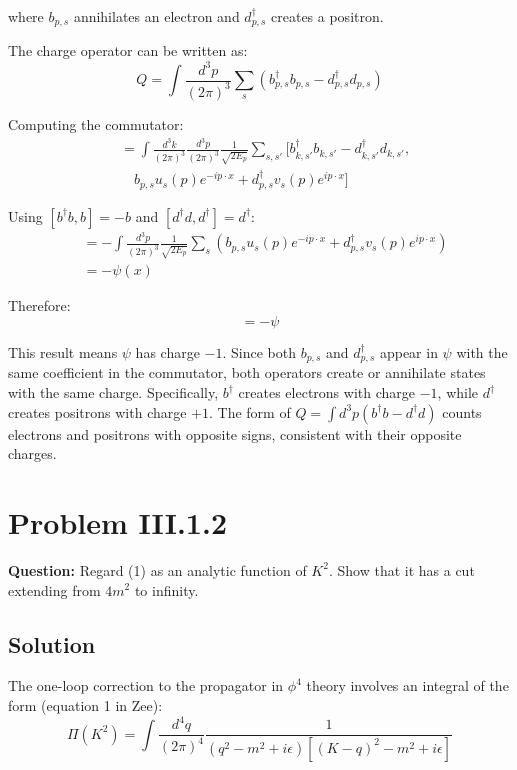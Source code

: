\documentclass[12pt]{article}
\begin{document}
where $b_{p,s}$ annihilates an electron and $d_{p,s}^\dagger$ creates a positron.

The charge operator can be written as:
\begin{equation}
Q = \int \frac{d^3p}{(2\pi)^3} \sum_s (b_{p,s}^\dagger b_{p,s} - d_{p,s}^\dagger d_{p,s})
\end{equation}

Computing the commutator:
\begin{align}
[Q, \psi(x)] &= \int \frac{d^3k}{(2\pi)^3} \frac{d^3p}{(2\pi)^3} \frac{1}{\sqrt{2E_p}} \sum_{s,s'} [b_{k,s'}^\dagger b_{k,s'} - d_{k,s'}^\dagger d_{k,s'}, \nonumber \\
&\quad b_{p,s} u_s(p) e^{-ip\cdot x} + d_{p,s}^\dagger v_s(p) e^{ip\cdot x}]
\end{align}

Using $[b^\dagger b, b] = -b$ and $[d^\dagger d, d^\dagger] = d^\dagger$:
\begin{align}
[Q, \psi(x)] &= -\int \frac{d^3p}{(2\pi)^3} \frac{1}{\sqrt{2E_p}} \sum_s \left( b_{p,s} u_s(p) e^{-ip\cdot x} + d_{p,s}^\dagger v_s(p) e^{ip\cdot x} \right) \\
&= -\psi(x)
\end{align}

Therefore:
\begin{equation}
[Q, \psi] = -\psi
\end{equation}

This result means $\psi$ has charge $-1$. Since both $b_{p,s}$ and $d_{p,s}^\dagger$ appear in $\psi$ with the same coefficient in the commutator, both operators create or annihilate states with the same charge. Specifically, $b^\dagger$ creates electrons with charge $-1$, while $d^\dagger$ creates positrons with charge $+1$. The form of $Q = \int d^3p (b^\dagger b - d^\dagger d)$ counts electrons and positrons with opposite signs, consistent with their opposite charges.

\section*{Problem III.1.2}
\textbf{Question:} Regard (1) as an analytic function of $K^2$. Show that it has a cut extending from $4m^2$ to infinity.

\subsection*{Solution}

The one-loop correction to the propagator in $\phi^4$ theory involves an integral of the form (equation 1 in Zee):
\begin{equation}
\Pi(K^2) = \int \frac{d^4q}{(2\pi)^4} \frac{1}{(q^2 - m^2 + i\epsilon)[(K-q)^2 - m^2 + i\epsilon]}
\end{equation}
\end{document}
